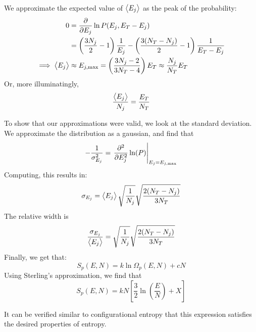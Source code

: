 We approximate the expected value of \(\left\langle \begin{matrix}E_j\end{matrix} \right\rangle\) as the peak of the probability:
\begin{align}
	0&=\frac{\partial}{\partial E_j}\ln P(E_j, E_T-E_j)\nonumber\\
	 &=\left(\frac{3N_j}{2}-1\right)\frac{1}{E_j}-\left(\frac{3(N_T-N_j)}{2}-1\right)\frac{1}{E_T-E_j}\nonumber\\
	\implies\left\langle \begin{matrix}E_j\end{matrix} \right\rangle&\approx E_{j,\max}=\left(\frac{3N_j-2}{3N_T-4}\right)E_T\approx \frac{N_j}{N_T}E_T
\end{align}
Or, more illuminatingly,
\begin{equation}
	\frac{\left\langle \begin{matrix}E_j\end{matrix} \right\rangle}{N_j}=\frac{E_T}{N_T}\label{eq4:equil}
\end{equation}

To show that our approximations were valid, we look at the standard deviation. We approximate the distribution as a gaussian, and find that 
\[-\frac{1}{\sigma^2_{E_j}}=\left.\frac{\partial^2}{\partial{E_j^2}}\ln(P)\right|_{E_j=E_{j,\max}}\]
Computing, this results in:
\begin{equation}
	\sigma_{E_j}=\left\langle \begin{matrix}E_j\end{matrix} \right\rangle\sqrt{\frac{1}{N_j}}\sqrt{\frac{2(N_T-N_j)}{3N_T}}
\end{equation}
The relative width is
\[\frac{\sigma_{E_j}}{\left\langle \begin{matrix}E_j\end{matrix} \right\rangle}=\sqrt{\frac{1}{N_j}}\sqrt{\frac{2(N_T-N_j)}{3N_T}}\]
Finally, we get that:
\[S_p (E, N) = k\ln\Omega_p(E,N)+cN\]
Using Sterling's approximation, we find that
\begin{equation}
	S_p(E,N)=kN\left[\frac{3}{2}\ln\left(\frac{E}{N}\right)+X\right]
\end{equation}

It can be verified similar to configurational entropy that this expression satisfies the desired properties of entropy.


